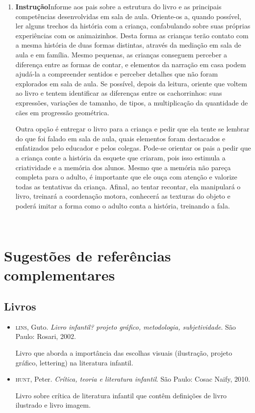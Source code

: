 \documentclass[11pt]{extarticle}
\begin{document}
\begin{enumerate}
\item \textbf{Instrução}\quad Informe aos pais sobre a estrutura do livro e as principais competências desenvolvidas em sala de aula.
Oriente-os a, quando possível, ler alguns trechos da história com a criança, confabulando sobre suas próprias experiências com os animaizinhos.
Desta forma as crianças terão contato com a mesma história de duas formas distintas, através da mediação em sala de aula e em família. 
Mesmo pequenas, as crianças conseguem perceber a diferença entre 
as formas de contar, e elementos da narração em casa podem ajudá-la a compreender 
sentidos e perceber detalhes que não foram explorados em sala de aula. Se possível, depois da leitura, oriente 
que voltem ao livro e tentem identificar as diferenças entre os cachorrinhos: suas expressões, variações de tamanho, de tipos, a multiplicação da quantidade de cães em progressão geométrica.

Outra opção é entregar o livro para a criança e pedir que ela tente se lembrar
do que foi falado em sala de aula, quais elementos foram destacados e enfatizados pelo educador e pelos colegas. Pode-se orientar os pais a pedir que a criança conte a história da esquete que criaram, pois isso estimula a criatividade e a memória dos alunos. Mesmo que a memória não pareça 
completa para o adulto, é importante que ele ouça com atenção e 
valorize todas as tentativas da criança. Afinal, ao tentar recontar, 
ela manipulará o livro, treinará a coordenação motora, conhecerá as texturas 
do objeto e poderá imitar a forma como o adulto 
conta a história, treinando a fala. 
\end{enumerate}

 
\section{Sugestões de referências complementares}

\subsection{Livros} 

\begin{itemize}
\item \textsc{lins}, Guto. \textit{Livro infantil? projeto gráfico, metodologia, subjetividade}. São Paulo: Rosari, 2002.

Livro que aborda a importância das escolhas visuais (ilustração, projeto gráfico, lettering) na literatura infantil.  

\item \textsc{hunt}, Peter. \textit{Crítica, teoria e literatura infantil}. São Paulo: Cosac Naify, 2010.

Livro sobre crítica de literatura infantil que contêm definições de livro ilustrado e livro imagem. 
\end{itemize}
\end{document}

